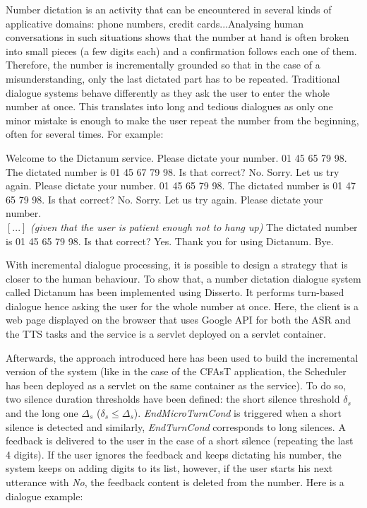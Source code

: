     	Number dictation is an activity that can be encountered in several kinds of applicative domains: phone numbers, credit cards...Analysing human conversations in such situations shows that the number at hand is often broken into small pieces (a few digits each) and a confirmation follows each one of them. Therefore, the number is incrementally grounded so that in the case of a misunderstanding, only the last dictated part has to be repeated. Traditional dialogue systems behave differently as they ask the user to enter the whole number at once. This translates into long and tedious dialogues as only one minor mistake is enough to make the user repeat the number from the beginning, often for several times. For example:
        
        \begin{dialogue}
        	 Welcome to the Dictanum service. Please dictate your number.
             01 45 65 79 98.
             The dictated number is 01 45 67 79 98. Is that correct?
             No.
             Sorry. Let us try again. Please dictate your number.
             01 45 65 79 98.
             The dictated number is 01 47 65 79 98. Is that correct?
             No.
             Sorry. Let us try again. Please dictate your number. \\
            $\left[...\right]$ \textit{(given that the user is patient enough not to hang up)}
             The dictated number is 01 45 65 79 98. Is that correct?
             Yes.
             Thank you for using Dictanum. Bye.
        \end{dialogue}
        
        With incremental dialogue processing, it is possible to design a strategy that is closer to the human behaviour. To show that, a number dictation dialogue system called Dictanum has been implemented using Disserto. It performs turn-based dialogue hence asking the user for the whole number at once. Here, the client is a web page displayed on the browser that uses Google API for both the ASR and the TTS tasks and the service is a servlet deployed on a servlet container.
        
        Afterwards, the approach introduced here has been used to build the incremental version of the system (like in the case of the CFAsT application, the Scheduler has been deployed as a servlet on the same container as the service). To do so, two silence duration thresholds have been defined: the short silence threshold $\delta_s$ and the long one $\Delta_s$ ($\delta_s \leq \Delta_s$). \textit{EndMicroTurnCond} is triggered when a short silence is detected and similarly, \textit{EndTurnCond} corresponds to long silences. A feedback is delivered to the user in the case of a short silence (repeating the last 4 digits). If the user ignores the feedback and keeps dictating his number, the system keeps on adding digits to its list, however, if the user starts his next utterance with \textit{No}, the feedback content is deleted from the number. Here is a dialogue example:
        
